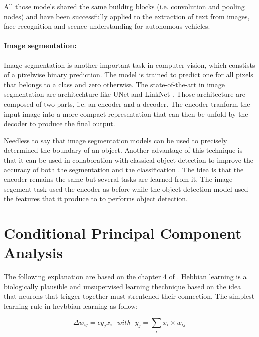 \documentclass[11pt]{report}
\begin{document}
\noindent All those models shared the same building blocks (i.e. convolution and pooling nodes) and have been successfully applied to the extraction of text from images, face recognition and scence understanding for autonomous vehicles.

\paragraph{Image segmentation:} Image segmentation is another important task in computer vision, which constists of a pixelwise binary prediction. The model is trained to predict one for all pixels that belongs to a class and zero otherwise. The state-of-the-art in image segmentation are architechture like UNet \cite{DBLP:conf/miccai/RonnebergerFB15} and LinkNet \cite{DBLP:conf/vcip/ChaurasiaC17}. Those architecture are composed of two parts, i.e. an encoder and a decoder. The encoder tranform the input image into a more compact representation that can then be unfold by the decoder to produce the final output.\newline

\noindent Needless to say that image segmentation models can be used to precisely determined the boundary of an object. Another advantage of this technique is that it can be used in collaboration with classical object detection to improve the accuracy of both the segmentation and the classification \cite{DBLP:conf/cvpr/KendallGC18}. The idea is that the encoder remains the same but several tasks are learned from it. The image segement task used the encoder as before while the object detection model used the features that it produce to to performs object detection.

\section{Conditional Principal Component Analysis}

The following explanation are based on the chapter 4 of \textcite{OReilly:2000:CEC:557205:chap4}. Hebbian learning is a biologically plausible and unsupervised learning thechnique based on the idea that neurons that trigger together must strentened their connection. The simplest learning rule in hevbbian learning as follow:

\begin{equation}
\Delta w_{ij} = \epsilon y_jx_i\ \ \ with\ \ \ y_j = \sum_{i}{x_i \times w_{ij}}
\end{equation}
\end{document}
